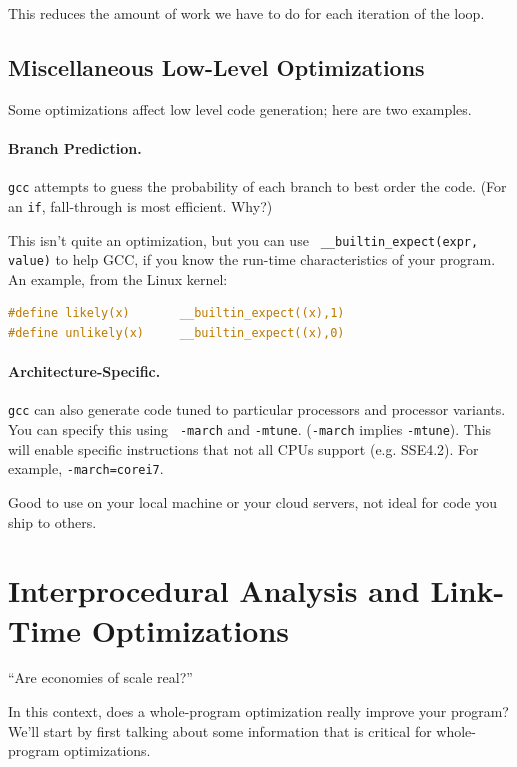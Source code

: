 \documentclass[a4paper]{report}
\begin{document}
This reduces the amount of work we have to do for each iteration of the loop.


\subsection*{Miscellaneous Low-Level Optimizations}
Some optimizations affect low level code generation; here are two examples.

\paragraph{Branch Prediction.} {\tt gcc} attempts to guess the probability of each branch to
best order the code. (For an {\tt if}, fall-through is most efficient. Why?)

This isn't quite an optimization, but you can use {\tt
  \_\_builtin\_expect(expr, value)} to help GCC, if you know the
run-time characteristics of your program. An example, from the
  Linux kernel:

  \begin{lstlisting}[language=C]
#define likely(x)       __builtin_expect((x),1)
#define unlikely(x)     __builtin_expect((x),0)
  \end{lstlisting}

\paragraph{Architecture-Specific.} {\tt gcc} can also generate code tuned to particular
processors and processor variants. You can specify this using {\tt
  -march} and {\tt -mtune}. ({\tt -march} implies {\tt -mtune}).
This will enable specific instructions that not all CPUs support (e.g. SSE4.2).
For example, {\tt -march=corei7}.

\noindent
Good to use on your local machine or your cloud servers, not ideal for code you ship to others.


\section*{Interprocedural Analysis and Link-Time Optimizations}
\hfill ``Are economies of scale real?''

In this context, does a
whole-program optimization really improve your program?
We'll start by first talking about some information that is critical for
whole-program optimizations.
\end{document}
